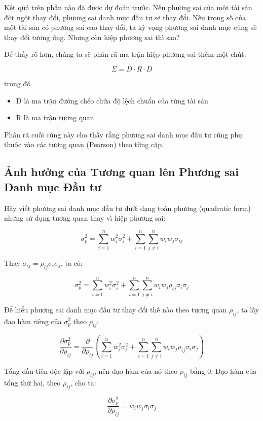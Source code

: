 Kết quả trên phần nào đã được dự đoán trước. Nếu phương sai của một tài sản đột ngột thay đổi, phương sai danh mục đầu tư sẽ thay đổi. Nếu trọng số của một tài sản có phương sai cao thay đổi, ta kỳ vọng phương sai danh mục cũng sẽ thay đổi tương ứng. Nhưng còn hiệp phương sai thì sao?

Để thấy rõ hơn, chúng ta sẽ phân rã ma trận hiệp phương sai thêm một chút:

$$
\Sigma = D \cdot R \cdot D
$$

trong đó

\begin{itemize}
  \item D là ma trận đường chéo chứa độ lệch chuẩn của từng tài sản
  \item R là ma trận tương quan
\end{itemize}

Phân rã cuối cùng này cho thấy rằng phương sai danh mục đầu tư cũng phụ thuộc vào các tương quan (Pearson) theo từng cặp.

\subsection{Ảnh hưởng của Tương quan lên Phương sai Danh mục Đầu tư}

Hãy viết phương sai danh mục đầu tư dưới dạng toàn phương (quadratic form) nhưng sử dụng tương quan thay vì hiệp phương sai:

$$
\sigma_p^2 = \sum_{i=1}^{n} w_i^2 \sigma_i^2 + \sum_{i=1}^{n}\sum_{j \neq i}^{n} w_i w_j \sigma_{ij}
$$

Thay $\sigma_{ij} = \rho_{ij} \sigma_i \sigma_j$, ta có:

$$
\sigma_p^2 = \sum_{i=1}^{n} w_i^2 \sigma_i^2 + \sum_{i=1}^{n}\sum_{j \neq i}^{n} w_i w_j \rho_{ij} \sigma_i \sigma_j
$$

Để hiểu phương sai danh mục đầu tư thay đổi thế nào theo tương quan $\rho_{ij}$, ta lấy đạo hàm riêng của $\sigma_p^2$ theo $\rho_{ij}$:

$$
\frac{\partial \sigma_p^2}{\partial \rho_{ij}} = \frac{\partial}{\partial \rho_{ij}} \left( \sum_{i=1}^{n} w_i^2 \sigma_i^2 + \sum_{i=1}^{n}\sum_{j \neq i}^{n} w_i w_j \rho_{ij} \sigma_i \sigma_j \right)
$$

Tổng đầu tiên độc lập với $\rho_{ij}$, nên đạo hàm của nó theo $\rho_{ij}$ bằng 0. Đạo hàm của tổng thứ hai, theo $\rho_{ij}$, cho ta:

$$
\frac{\partial \sigma_p^2}{\partial \rho_{ij}} = w_i w_j \sigma_i \sigma_j
$$

